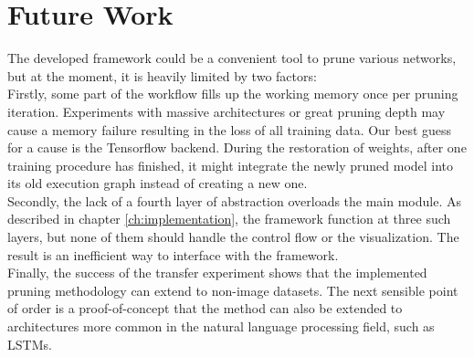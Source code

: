 \section{Future Work}
The developed framework could be a convenient tool to prune various networks, but at the moment, it is heavily limited by two factors:
\\
Firstly, some part of the workflow fills up the working memory once per pruning iteration. Experiments with massive architectures or great pruning depth may cause a memory failure resulting in the loss of all training data. Our best guess for a cause is the Tensorflow backend. During the restoration of weights, after one training procedure has finished, it might integrate the newly pruned model into its old execution graph instead of creating a new one.
\\
Secondly, the lack of a fourth layer of abstraction overloads the main module. As described in chapter \ref{ch:implementation}, the framework function at three such layers, but none of them should handle the control flow or the visualization. The result is an inefficient way to interface with the framework.
\\
Finally, the success of the transfer experiment shows that the implemented pruning methodology can extend to non-image datasets. The next sensible point of order is a proof-of-concept that the method can also be extended to architectures more common in the natural language processing field, such as LSTMs.

